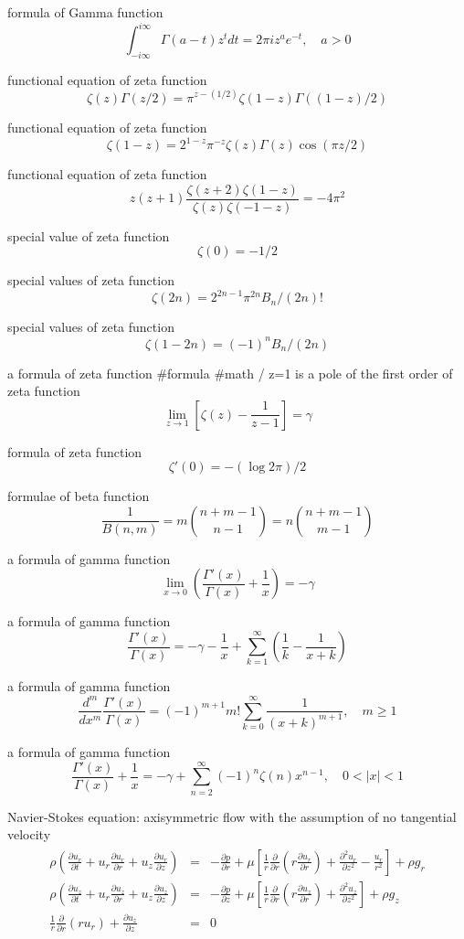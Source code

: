 formula of Gamma function
$$
\int^{i\infty}_{-i\infty}\Gamma(a-t)z^tdt=2\pi i z^a e^{-t}, \quad a>0
$$

functional equation of zeta function
$$
\zeta(z)\Gamma(z/2)=\pi^{z-(1/2)}\zeta(1-z)\Gamma((1-z)/2)
$$

functional equation of zeta function
$$
\zeta(1-z)=2^{1-z}\pi^{-z}\zeta(z)\Gamma(z)\cos(\pi z/2)
$$

functional equation of zeta function
$$
z(z+1)\frac{\zeta(z+2)\zeta(1-z)}{\zeta(z)\zeta(-1-z)}=-4\pi^2
$$

special value of zeta function
$$
\zeta(0)=-1/2
$$

special values of zeta function
$$
\zeta(2n)=2^{2n-1}\pi^{2n}B_n/(2n)!
$$

special values of zeta function
$$
\zeta(1-2n)=(-1)^nB_n/(2n)
$$

a formula of zeta function #formula #math / z=1 is a pole of the first order of zeta function 
$$
\lim_{z\rightarrow 1}\left[\zeta(z)-\frac{1}{z-1}\right]=\gamma
$$

formula of zeta function
$$
\zeta'(0)=-(\log 2\pi)/2
$$

formulae of beta function
$$
\frac{1}{B(n,m)}=m\binom{n+m-1}{n-1}=n\binom{n+m-1}{m-1}
$$


a formula of gamma function
$$
\lim_{x\rightarrow 0}\left(\frac{\Gamma'(x)}{\Gamma(x)}+\frac{1}{x}\right)=-\gamma
$$

a formula of gamma function
$$
\frac{\Gamma'(x)}{\Gamma(x)}=-\gamma-\frac{1}{x}+\sum^\infty_{k=1}\left(\frac{1}{k}-\frac{1}{x+k}\right)
$$

a formula of gamma function
$$
\frac{d^m}{dx^m}\frac{\Gamma'(x)}{\Gamma(x)}=(-1)^{m+1}m!\sum^\infty_{k=0}\frac{1}{(x+k)^{m+1}}, \quad m \ge 1
$$

a formula of gamma function
$$
\frac{\Gamma'(x)}{\Gamma(x)}+\frac{1}{x}=-\gamma+\sum^\infty_{n=2}(-1)^n\zeta(n)x^{n-1}, \quad 0<|x|<1
$$

Navier-Stokes equation: axisymmetric flow with the assumption of no tangential velocity
\begin{eqnarray}
\begin{array}{cll}
\displaystyle \rho\left(\frac{\partial u_r}{\partial t}+u_r\frac{\partial u_r}{\partial r}+u_z\frac{\partial u_r}{\partial z}\right) &=& \displaystyle -\frac{\partial p}{\partial r}+\mu\left[\frac{1}{r}\frac{\partial}{\partial r}\left(r\frac{\partial u_r}{\partial r}\right)+\frac{\partial^2 u_r}{\partial z^2}-\frac{u_r}{r^2}\right]+\rho g_r \\
\displaystyle \rho\left(\frac{\partial u_z}{\partial t}+u_r\frac{\partial u_z}{\partial r}+u_z\frac{\partial u_z}{\partial z}\right) &=& \displaystyle -\frac{\partial p}{\partial z}+\mu\left[\frac{1}{r}\frac{\partial}{\partial r}\left(r\frac{\partial u_z}{\partial r}\right)+\frac{\partial^2 u_z}{\partial z^2}\right]+\rho g_z \\
\displaystyle \frac{1}{r}\frac{\partial}{\partial r}(r u_r)+\frac{\partial u_z}{\partial z}&=&0
\end{array} \nonumber
\end{eqnarray}

